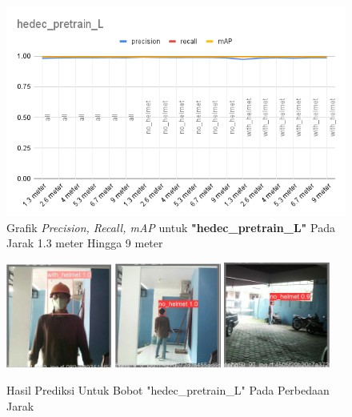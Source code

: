 \begin{enumerate}
  \begin{figure} [h!]
    \centering
    \includegraphics[width=1\textwidth]{gambar/BerdasarkanJarak/hedec_pretrain_L.png}
    \caption{Grafik \emph{Precision, Recall, mAP} untuk \textbf{"hedec\_pretrain\_L"} Pada Jarak 1.3 meter Hingga 9 meter}
    \label{fig:grafvaljarak_hedec_pretrain_L}  
  \end{figure}

  \begin{figure} [h!]
    \centering
    \includegraphics[width=0.31\textwidth]{gambar/BerdasarkanJarak_v2/val_hedec_pretrain_L/Jarak1_3/val_batch0_pred.jpg}
    \includegraphics[width=0.31\textwidth]{gambar/BerdasarkanJarak_v2/val_hedec_pretrain_L/Jarak5_3/val_batch0_pred.jpg}
    \includegraphics[width=0.31\textwidth]{gambar/BerdasarkanJarak_v2/val_hedec_pretrain_L/Jarak9/val_batch0_pred.jpg}
    \caption{Hasil Prediksi Untuk Bobot "hedec\_pretrain\_L" Pada Perbedaan Jarak}
    \label{fig:valjarak_sample_hedec_pretrain_L}  
  \end{figure}

\end{enumerate}


